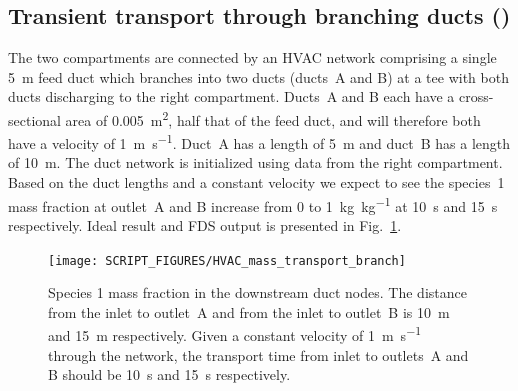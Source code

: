 \documentclass[11pt]{book}
\begin{document}
\subsection{Transient transport through branching ducts (\texorpdfstring{}{HVAC\_mass\_transport\_branch})}
\label{HVAC_mass_transport_branch}
The two compartments are connected by an HVAC network comprising a single \SI{5}{\meter} feed duct which branches into two ducts (ducts~A and B) at a tee with both ducts discharging to the right compartment. Ducts~A and B each have a cross-sectional area of \SI{0.005}{\meter\squared}, half that of the feed duct, and will therefore both have a velocity of \SI[per-mode=symbol]{1}{\meter\per\second}. Duct~A has a length of \SI{5}{\meter} and duct~B has a length of \SI{10}{\meter}. The duct network is initialized using data from the right compartment. Based on the duct lengths and a constant velocity we expect to see the species~\num{1} mass fraction at outlet~A and B increase from \num{0} to \SI[per-mode=symbol]{1}{\kilogram\per\kilogram} at \SI{10}{\second} and \SI{15}{\second} respectively. Ideal result and FDS output is presented in Fig.~\ref{fig_HVAC_mass_transport_branch}.

\begin{figure}[ht]
\centering
\texttt{[image: SCRIPT\_FIGURES/HVAC\_mass\_transport\_branch]}
\caption[ test case.]{Species \num{1} mass fraction in the downstream duct nodes. The distance from the inlet to outlet~A and from the inlet to outlet~B is \SI{10}{\meter} and \SI{15}{\meter} respectively. Given a constant velocity of \SI[per-mode=symbol]{1}{\meter\per\second} through the network, the transport time from inlet to outlets~A and B should be \SI{10}{\second} and \SI{15}{\second} respectively.}
\label{fig_HVAC_mass_transport_branch}
\end{figure}
\end{document}
